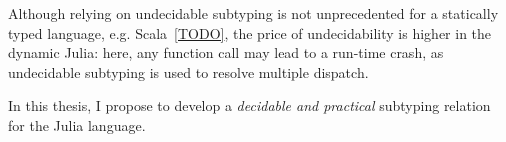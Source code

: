 Although relying on undecidable subtyping is not unprecedented
for a statically typed language, e.g. Scala~\ref{TODO},
the price of undecidability is higher in the dynamic Julia:
here, any function call may lead to a run-time crash,
as undecidable subtyping is used to resolve multiple dispatch.



In this thesis, I propose to develop
a \emph{decidable and practical} subtyping relation for the Julia language.

%




